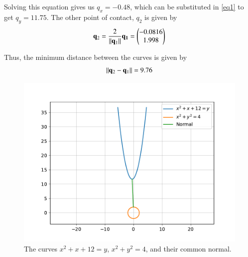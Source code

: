 \documentclass[journal]{IEEEtran}
\begin{document}
Solving this equation gives us $q_x = -0.48$, which can be substituted in \ref{eq1}
to get $q_y = 11.75$. The other point of contact, $q_2$ is given by
$$
\mathbf{q}_2 = \frac{2}{\left\lVert\mathbf{q}_1\right\rVert} \mathbf{q_1} = \begin{pmatrix}-0.0816 \\ 1.998\end{pmatrix}
$$

Thus, the minimum distance between the curves is given by
\begin{align}
    \left\lVert\mathbf{q}_2 - \mathbf{q}_1\right\rVert = 9.76
\end{align}

\begin{figure}
    \centering
    \includegraphics[width=0.7\linewidth]{figs/fig.pdf}
    \caption{The curves $x^2 + x + 12 = y$, $x^2 + y^2 = 4$, and their common normal.}
\end{figure}
\end{document}
